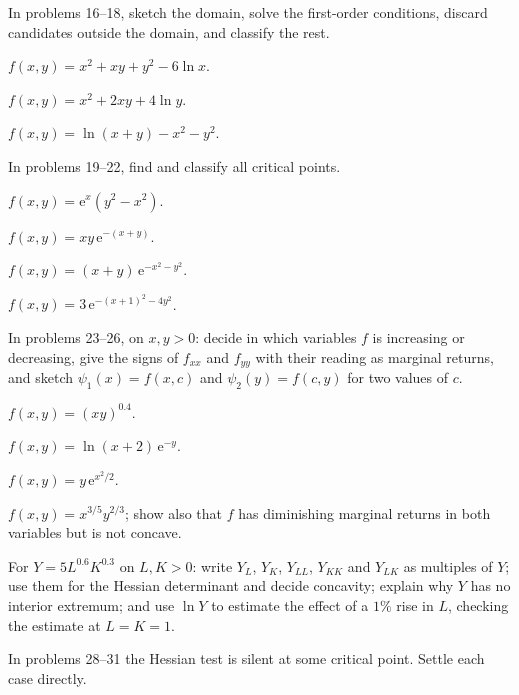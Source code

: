 In problems 16--18, sketch the domain, solve the first-order conditions,
discard candidates outside the domain, and classify the rest.

\begin{problems}[resume]
  \item $f(x,y)=x^{2}+xy+y^{2}-6\ln x$.
  \item $f(x,y)=x^{2}+2xy+4\ln y$.
  \item $f(x,y)=\ln(x+y)-x^{2}-y^{2}$.
\end{problems}

In problems 19--22, find and classify all critical points.

\begin{problems}[resume]
  \item $f(x,y)=\mathrm{e}^{x}(y^{2}-x^{2})$.
  \item $f(x,y)=xy\,\mathrm{e}^{-(x+y)}$.
  \item $f(x,y)=(x+y)\,\mathrm{e}^{-x^{2}-y^{2}}$.
  \item $f(x,y)=3\,\mathrm{e}^{-(x+1)^{2}-4y^{2}}$.
\end{problems}

In problems 23--26, on $x,y>0$: decide in which variables $f$ is
increasing or decreasing, give the signs of $f_{xx}$ and $f_{yy}$ with their
reading as marginal returns, and sketch $\psi_{1}(x)=f(x,c)$ and
$\psi_{2}(y)=f(c,y)$ for two values of $c$.

\begin{problems}[resume]
  \item $f(x,y)=(xy)^{0.4}$.
  \item $f(x,y)=\ln(x+2)\,\mathrm{e}^{-y}$.
  \item $f(x,y)=y\,\mathrm{e}^{x^{2}/2}$.
  \item $f(x,y)=x^{3/5}y^{2/3}$; show also that $f$ has diminishing
        marginal returns in both variables but is not concave.
  \item For $Y=5L^{0.6}K^{0.3}$ on $L,K>0$: write $Y_{L}$, $Y_{K}$,
        $Y_{LL}$, $Y_{KK}$ and $Y_{LK}$ as multiples of $Y$; use them for
        the Hessian determinant and decide concavity; explain why $Y$ has
        no interior extremum; and use $\ln Y$ to estimate the effect of a
        $1\%$ rise in $L$, checking the estimate at $L=K=1$.
\end{problems}

In problems 28--31 the Hessian test is silent at some critical point.
Settle each case directly.

